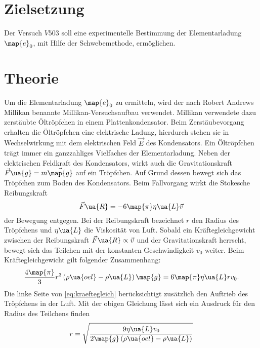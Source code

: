 \setcounter{page}{1}
\section*{Zielsetzung}
Der Versuch $V503$ soll eine experimentelle Bestimmung der Elementarladung $\map{e}_0$, mit Hilfe der Schwebemethode, ermöglichen.
\section{Theorie}
Um die Elementarladung $\map{e}_0$ zu ermitteln, wird der nach Robert Andrews Millikan benannte %
Millikan-Versuchsaufbau verwendet. Millikan verwendete dazu zerstäubte Öltröpfchen in einem %
Plattenkondensator. Beim Zerstäubevorgang erhalten die Öltröpfchen eine elektrische
Ladung, hierdurch stehen sie in Wechselwirkung mit dem elektrischen Feld $\vec{E}$ des
Kondensators. Ein Öltröpfchen trägt immer ein ganzzahliges Vielfaches der Elementarladung. %
Neben der elektrischen Feldkraft des Kondensators, wirkt auch die Gravitationskraft %
$\vec{F}\ua{g}=m\vec{\map{g}}$ auf ein Tröpfchen. %
Auf Grund dessen bewegt sich das Tröpfchen zum Boden
des Kondensators. Beim Fallvorgang wirkt die Stokesche Reibungskraft %
\begin{equation*}
  \vec{F}\ua{R}=-6\map{\pi}\eta\ua{L}\vec{v}
\end{equation*}
der Bewegung entgegen. Bei der Reibungskraft bezeichnet $r$ den Radius des
Tröpfchens und $\eta\ua{L}$ die Viskosität von Luft. Sobald ein Kräftegleichgewicht
zwischen der Reibungskraft $\vec{F}\ua{R}\propto \vec{v}$ und der Gravitationskraft
herrscht, bewegt sich das Teilchen mit der konstanten Geschwindigkeit $v_0$ weiter.
Beim Kräftegleichgewicht gilt folgender Zusammenhang:
\begin{equation}
  \label{eq:kraeftegleich}
  \frac{4\map{\pi}}{3}r^3\left(\rho\ua{oel}-\rho\ua{L}\right)\map{g}=6\map{\pi}\eta\ua{L}r v_0.
\end{equation}
Die linke Seite von \eqref{eq:kraeftegleich} berücksichtigt zusätzlich den Auftrieb des %
Tröpfchens in der Luft. Mit der obigen Gleichung lässt sich ein Ausdruck für den Radius %
des Teilchens finden %
\begin{equation}
  \label{eq:radius_teilchen}
  r=\sqrt{\frac{9\eta\ua{L}v_0}{2\map{g}\left(\rho\ua{oel}-\rho\ua{L}\right)}}
\end{equation}
